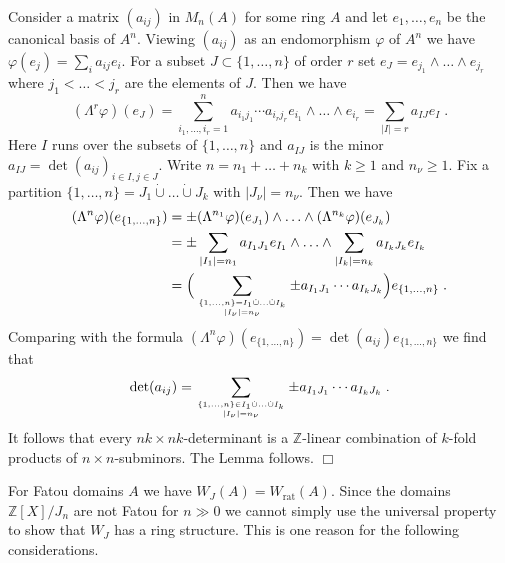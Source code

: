 \documentclass[12pt,leqno]{article}
\newcommand{\Z}{{\mathbb{Z}}}
\newcommand{\rat}{\mathrm{rat}}
\newcommand{\dcup}{\dot{\cup}}
\newenvironment{proof}{\noindent {\bf Proof}}{\mbox{}\hspace*{\fill}$\Box$}
\begin{document}
\begin{proof}
Consider a matrix $(a_{ij})$ in $M_n (A)$ for some ring $A$ and let $e_1 , \ldots , e_n$ be the canonical basis of $A^n$. Viewing $(a_{ij})$ as an endomorphism $\varphi$ of $A^n$ we have $\varphi (e_j) = \sum_i a_{ij} e_i$. For a subset $J \subset \{ 1 , \ldots , n \}$ of order $r$ set $e_J = e_{j_1} \wedge \ldots \wedge e_{j_r}$ where $j_1 < \ldots < j_r$ are the elements of $J$. Then we have
\[
(\Lambda^r \varphi) (e_J) = \sum^n_{i_1 , \ldots , i_r = 1} a_{i_1 j_1} \cdots a_{i_r j_r} e_{i_1} \wedge \ldots \wedge e_{i_r} = \sum_{|I| = r} a_{IJ} e_I \; .
\]
Here $I$ runs over the subsets of $\{ 1 , \ldots , n \}$ and $a_{IJ}$ is the minor $a_{IJ} = \det (a_{ij})_{i \in I , j \in J}$. Write $n = n_1 + \ldots + n_k$ with $k \ge 1$ and $n_{\nu} \ge 1$. Fix a partition $\{ 1 , \ldots , n \} = J_1 \dcup \ldots \dcup J_k$ with $|J_{\nu}| = n_{\nu}$. Then we have
\begin{align*}
(\Lambda^n \varphi) (e_{\{ 1 , \ldots , n \}} ) & = \pm (\Lambda^{n_1} \varphi) (e_{J_1}) \wedge \ldots \wedge (\Lambda^{n_k} \varphi) (e_{J_k}) \\
& = \pm \sum_{|I_1| = n_1} a_{I_1 J_1} e_{I_1} \wedge \ldots \wedge \sum_{|I_k| = n_k} a_{I_k J_k} e_{I_k} \\
& = \Big( \sum_{\{ 1 , \ldots , n \} = I_1 \dcup \ldots \dcup I_k \atop |I_{\nu}| = n_{\nu}} \pm a_{I_1 J_1} \cdots a_{I_k J_k} \Big) e_{\{ 1 , \ldots , n \} } \; .
\end{align*}
Comparing with the formula $(\Lambda^n \varphi) (e_{ \{ 1 , \ldots , n \} }) = \det (a_{ij}) e_{ \{ 1, \ldots , n \} }$ we find that
\[
\det (a_{ij})  = \sum_{\{ 1 , \ldots , n \} \in I_1 \dcup \ldots \dcup I_k \atop |I_{\nu}| = n_{\nu}} \pm a_{I_1 J_1} \cdots a_{I_k J_k} \; .
\]
It follows that every $nk \times nk$-determinant is a $\Z$-linear combination of $k$-fold products of $n \times n$-subminors. The Lemma follows. 
\end{proof}

For Fatou domains $A$ we have $W_J (A) = W_{\rat} (A)$. Since the domains $\Z [X] / J_n$ are not Fatou for $n \gg 0$ we cannot simply use the universal property to show that $W_J$ has a ring structure. This is one reason for the following considerations.
\end{document}
